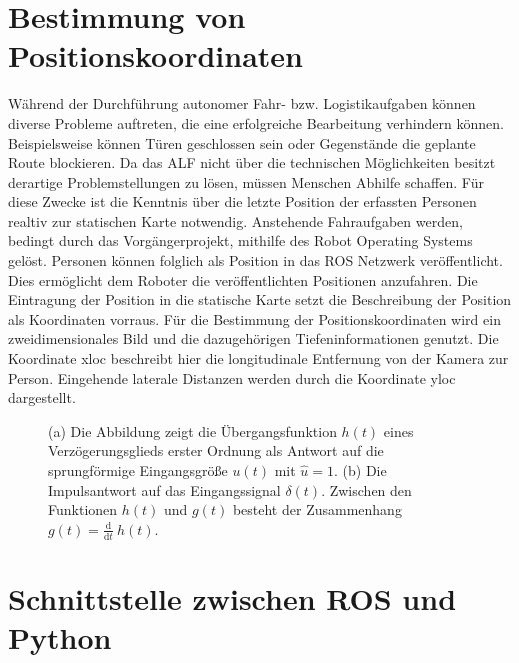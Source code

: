 	\section{Bestimmung von Positionskoordinaten}
		Während der Durchführung autonomer Fahr- bzw. Logistikaufgaben können diverse Probleme auftreten, die eine erfolgreiche Bearbeitung verhindern können. Beispielsweise können Türen geschlossen sein oder Gegenstände die geplante Route blockieren. Da das ALF nicht über die technischen Möglichkeiten besitzt derartige Problemstellungen zu lösen, müssen Menschen Abhilfe schaffen. Für diese Zwecke ist die Kenntnis über die letzte Position der erfassten Personen realtiv zur statischen Karte  notwendig. Anstehende Fahraufgaben werden, bedingt durch das Vorgängerprojekt, mithilfe des Robot Operating Systems gelöst. Personen können folglich als Position in das ROS Netzwerk veröffentlicht. Dies ermöglicht dem Roboter die veröffentlichten Positionen anzufahren. Die Eintragung der Position in die statische Karte setzt die Beschreibung der Position als Koordinaten vorraus. Für die Bestimmung der Positionskoordinaten wird ein zweidimensionales Bild und die dazugehörigen Tiefeninformationen genutzt. Die Koordinate xloc beschreibt hier die longitudinale Entfernung von der Kamera zur Person. Eingehende laterale Distanzen werden durch die Koordinate yloc dargestellt.
		
	\begin{figure}[H]
		\centering
		
		\caption{(a) Die Abbildung zeigt die Übergangsfunktion $h(t)$ eines Verzögerungsglieds erster Ordnung als Antwort auf die sprungförmige Eingangsgröße $u(t)$ mit $\hat{u}=1$. (b) Die Impulsantwort auf das Eingangssignal $\delta(t)$. Zwischen den Funktionen $h(t)$ und $g(t)$ besteht der Zusammenhang \mbox{$g(t)=\frac{\mathrm d}{\mathrm d t}\:h(t)$}.}
		\label{fig: antworten}
	\end{figure}

	\section{Schnittstelle zwischen ROS und Python}
	     
	

